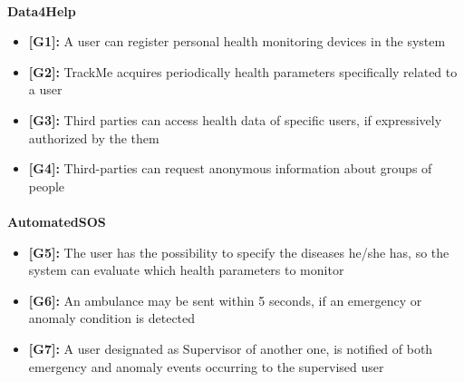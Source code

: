 \begin{flushleft}
\paragraph{}
\textbf{Data4Help}\par
\begin{itemize}
\item \textbf{[G1]:} A user can register personal health monitoring devices in the system
\item \textbf{[G2]:} TrackMe acquires periodically health parameters specifically related to a user
\item \textbf{[G3]:} Third parties can access health data of specific users, if expressively authorized by the them
\item \textbf{[G4]:} Third-parties can request anonymous information about groups of people
\end{itemize}

\paragraph{}
\textbf{AutomatedSOS}
\begin{itemize}
\item \textbf{[G5]:} The user has the possibility to specify the diseases he/she has, so the system can evaluate which health parameters to monitor
\item \textbf{[G6]:} An ambulance may be sent within 5 seconds, if an emergency or anomaly condition is detected
\item \textbf{[G7]:} A user designated as Supervisor of another one, is notified of both emergency and anomaly events occurring to the supervised user
\end{itemize}

\newpage
{}


\end{flushleft}
